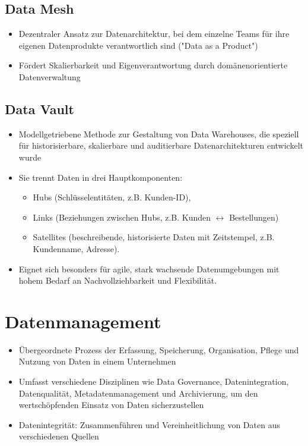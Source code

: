 \documentclass[11pt]{scrartcl}
\begin{document}
\subsection{Data Mesh}
\begin{itemize}
	\item Dezentraler Ansatz zur Datenarchitektur, bei dem einzelne Teams für ihre eigenen Datenprodukte verantwortlich sind ("Data as a Product")
	\item Fördert Skalierbarkeit und Eigenverantwortung durch domänenorientierte Datenverwaltung
\end{itemize}


\subsection{Data Vault}
\begin{itemize}
	\item Modellgetriebene Methode zur Gestaltung von Data Warehouses, die speziell für historisierbare, skalierbare und auditierbare Datenarchitekturen entwickelt wurde
	\item Sie trennt Daten in drei Hauptkomponenten:
	\begin{itemize}
		\item Hubs (Schlüsselentitäten, z.B. Kunden-ID),
		\item Links (Beziehungen zwischen Hubs, z.B. Kunden $ \leftrightarrow $ Bestellungen)
		\item Satellites (beschreibende, historisierte Daten mit Zeitstempel, z.B. Kundenname, Adresse).
	\end{itemize}
	\item Eignet sich besonders für agile, stark wachsende Datenumgebungen mit hohem Bedarf an Nachvollziehbarkeit und Flexibilität.
\end{itemize}


\section{Datenmanagement}
\begin{itemize}
\item Übergeordnete Prozess der Erfassung, Speicherung, Organisation, Pflege und Nutzung von Daten in einem Unternehmen
\item Umfasst verschiedene Disziplinen wie Data Governance, Datenintegration, Datenqualität, Metadatenmanagement und Archivierung, um den wertschöpfenden Einsatz von Daten sicherzustellen
\item Datenintegrität: Zusammenführen und Vereinheitlichung von Daten aus verschiedenen Quellen 
\end{itemize}
\end{document}
